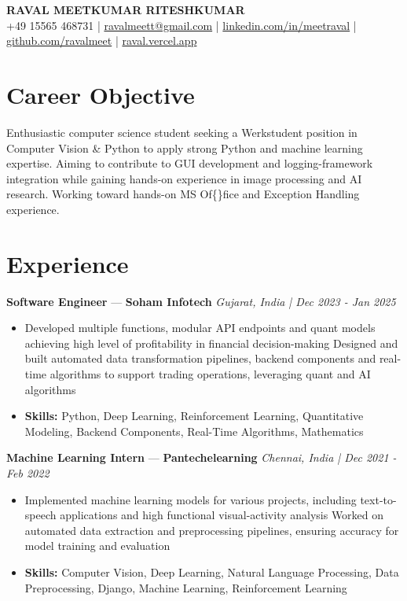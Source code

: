 \documentclass[a4paper,10pt]{article}
\begin{document}
\begin{center}
  {\Large\bfseries RAVAL MEETKUMAR RITESHKUMAR}\\[2pt]
  {\small +49 15565 468731 \;|\; \href{mailto:ravalmeett@gmail.com}{ravalmeett@gmail.com} \;|\; \href{https://www.linkedin.com/in/meetraval/}{linkedin.com/in/meetraval} \;|\; \href{https://github.com/ravalmeet}{github.com/ravalmeet} \;|\; \href{https://raval.vercel.app/}{raval.vercel.app}}
\end{center}
\vspace{-3pt}

\section*{Career Objective}
Enthusiastic computer science student seeking a Werkstudent position in Computer Vision \& Python to apply strong Python and machine learning expertise. Aiming to contribute to GUI development and logging-framework integration while gaining hands-on experience in image processing and AI research. Working toward hands-on MS Of\{\}fice and Exception Handling experience.\par

\section*{Experience}
\textbf{Software Engineer} — \textbf{Soham Infotech} \hfill \textit{Gujarat, India \;|\; Dec 2023 - Jan 2025}\par
\vspace{1pt}
\begin{itemize}
  \item Developed multiple functions, modular API endpoints and quant models achieving high level of profitability in financial decision-making Designed and built automated data transformation pipelines, backend components and real-time algorithms to support trading operations, leveraging quant and AI algorithms
  \item \textbf{Skills:} Python, Deep Learning, Reinforcement Learning, Quantitative Modeling, Backend Components, Real-Time Algorithms, Mathematics
\end{itemize}
\vspace{3pt}
\textbf{Machine Learning Intern} — \textbf{Pantechelearning} \hfill \textit{Chennai, India \;|\; Dec 2021 - Feb 2022}\par
\vspace{1pt}
\begin{itemize}
  \item Implemented machine learning models for various projects, including text-to-speech applications and high functional visual-activity analysis Worked on automated data extraction and preprocessing pipelines, ensuring accuracy for model training and evaluation
  \item \textbf{Skills:} Computer Vision, Deep Learning, Natural Language Processing, Data Preprocessing, Django, Machine Learning, Reinforcement Learning
\end{itemize}
\end{document}
